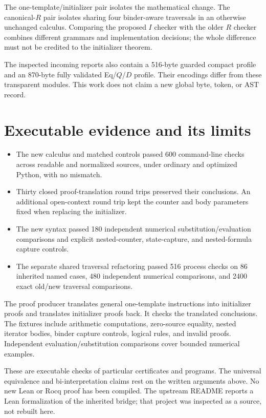 \documentclass[11pt,a4paper]{article}
\theoremstyle{definition}
\begin{document}
The one-template/initializer pair isolates the mathematical change.
The canonical-\(R\) pair isolates sharing four binder-aware traversals
in an otherwise unchanged calculus. Comparing the proposed \(I\)
checker with the older \(R\) checker combines different grammars and
implementation decisions; the whole difference must not be credited
to the initializer theorem.

The inspected incoming reports also contain a 516-byte guarded compact
profile and an 870-byte fully validated Eq/\(Q\)/\(D\) profile. Their
encodings differ from these transparent modules. This work does not
claim a new global byte, token, or AST record.

\section{Executable evidence and its limits}
\label{sec:verification}

\begin{itemize}
\item The new calculus and matched controls passed 600 command-line
checks across readable and normalized sources, under ordinary and
optimized Python, with no mismatch.
\item Thirty closed proof-translation round trips preserved their
conclusions. An additional open-context round trip kept the counter
and body parameters fixed when replacing the initializer.
\item The new syntax passed 180 independent numerical
substitution/evaluation comparisons and explicit nested-counter,
state-capture, and nested-formula capture controls.
\item The separate shared traversal refactoring passed 516 process
checks on 86 inherited named cases, 480 independent numerical
comparisons, and 2400 exact old/new traversal comparisons.
\end{itemize}


The proof producer translates general one-template instructions into
initializer proofs and translates initializer proofs back. It checks
the translated conclusions. The fixtures include arithmetic
computations, zero-source equality, nested iterator bodies, binder
capture controls, logical rules, and invalid proofs. Independent
evaluation/substitution comparisons cover bounded numerical examples.

These are executable checks of particular certificates and programs.
The universal equivalence and bi-interpretation claims rest on the
written arguments above. No new Lean or Rocq proof has been compiled.
The upstream README reports a Lean formalization of the inherited
bridge; that project was inspected as a source, not rebuilt here.
\end{document}
